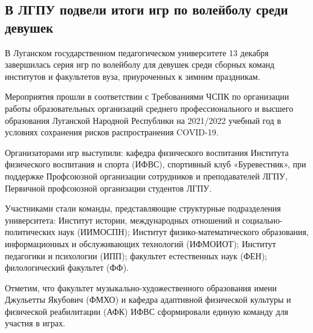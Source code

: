  
 
 
 
 
\subsection{В ЛГПУ подвели итоги игр по волейболу среди девушек }
\label{sec:13_12_2021.stz.edu.lnr.lgpu.1.volejbol_devushki}


В Луганском государственном педагогическом университете 13 декабря завершилась
серия игр по волейболу для девушек среди сборных команд институтов и
факультетов вуза, приуроченных к зимним праздникам. 


Мероприятия прошли в соответствии с Требованиями ЧСПК по организации работы
образовательных организаций среднего профессионального и высшего образования
Луганской Народной Республики на 2021/2022 учебный год в условиях сохранения
рисков распространения COVID-19.


Организаторами игр выступили: кафедра физического воспитания Института
физического воспитания и спорта (ИФВС), спортивный клуб «Буревестник», при
поддержке Профсоюзной организации сотрудников и преподавателей ЛГПУ, Первичной
профсоюзной организации студентов ЛГПУ.

Участниками стали команды, представляющие структурные подразделения
университета: Институт истории, международных отношений и
социально-политических наук (ИИМОСПН); Институт физико-математического
образования, информационных и обслуживающих технологий (ИФМОИОТ); Институт
педагогики и психологии (ИПП); факультет естественных наук (ФЕН);
филологический факультет (ФФ). 

Отметим, что факультет музыкально-художественного образования имени Джульетты
Якубович (ФМХО) и кафедра адаптивной физической культуры и физической
реабилитации (АФК) ИФВС сформировали единую команду для участия в играх.


